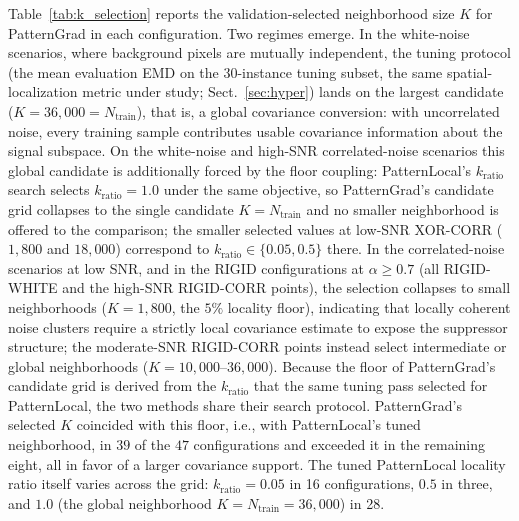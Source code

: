 \documentclass[pdflatex,sn-mathphys-num]{sn-jnl}
\theoremstyle{thmstyleone}
\theoremstyle{thmstyletwo}%
\theoremstyle{thmstylethree}%
\begin{document}
Table~\ref{tab:k_selection} reports the validation-selected neighborhood size $K$ for PatternGrad in each configuration. Two regimes emerge. In the white-noise scenarios, where background pixels are mutually independent, the tuning protocol (the mean evaluation EMD on the $30$-instance tuning subset, the same spatial-localization metric under study; Sect.~\ref{sec:hyper}) lands on the largest candidate ($K = 36{,}000 = N_{\text{train}}$), that is, a global covariance conversion: with uncorrelated noise, every training sample contributes usable covariance information about the signal subspace. On the white-noise and high-SNR correlated-noise scenarios this global candidate is additionally forced by the floor coupling: PatternLocal's $k_{\text{ratio}}$ search selects $k_{\text{ratio}} = 1.0$ under the same objective, so PatternGrad's candidate grid collapses to the single candidate $K = N_{\text{train}}$ and no smaller neighborhood is offered to the comparison; the smaller selected values at low-SNR XOR-CORR ($1{,}800$ and $18{,}000$) correspond to $k_{\text{ratio}} \in \{0.05, 0.5\}$ there. In the correlated-noise scenarios at low SNR, and in the RIGID configurations at $\alpha \ge 0.7$ (all RIGID-WHITE and the high-SNR RIGID-CORR points), the selection collapses to small neighborhoods ($K = 1{,}800$, the $5\%$ locality floor), indicating that locally coherent noise clusters require a strictly local covariance estimate to expose the suppressor structure; the moderate-SNR RIGID-CORR points instead select intermediate or global neighborhoods ($K = 10{,}000$--$36{,}000$). Because the floor of PatternGrad's candidate grid is derived from the $k_{\text{ratio}}$ that the same tuning pass selected for PatternLocal, the two methods share their search protocol. PatternGrad's selected $K$ coincided with this floor, i.e., with PatternLocal's tuned neighborhood, in $39$ of the $47$ configurations and exceeded it in the remaining eight, all in favor of a larger covariance support. The tuned PatternLocal locality ratio itself varies across the grid: $k_{\text{ratio}} = 0.05$ in 16 configurations, $0.5$ in three, and $1.0$ (the global neighborhood $K = N_{\text{train}} = 36{,}000$) in 28.
\end{document}
